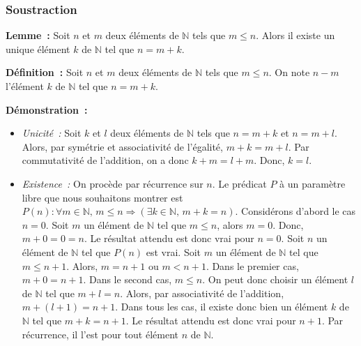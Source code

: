    \done 

\subsubsection{Soustraction}

\noindent\textbf{Lemme :} Soit $n$ et $m$ deux éléments de $\mathbb{N}$ tels que $m \leq n$. 
    Alors il existe un unique élément $k$ de $\mathbb{N}$ tel que $n=m+k$.

\medskip

\noindent\textbf{Définition :} Soit $n$ et $m$ deux éléments de $\mathbb{N}$ tels que $m \leq n$. 
    On note $n-m$ l'élément $k$ de $\mathbb{N}$ tel que $n = m  + k$.

\medskip

\noindent\textbf{Démonstration :} 
    \begin{itemize}[nosep]
        \item \textit{Unicité :}
            Soit $k$ et $l$ deux éléments de $\mathbb{N}$ tels que $n = m + k$ et $n = m + l$.
            Alors, par symétrie et associativité de l'égalité, $m + k = m + l$. 
            Par commutativité de l'addition, on a donc $k + m = l + m$.
            Donc, $k = l$.
        \item \textit{Existence :}
            On procède par récurrence sur $n$. 
            Le prédicat $P$ à un paramètre libre que nous souhaitons montrer est $P(n): \forall m \in \mathbb{N}, \, m \leq n \Rightarrow (\exists k \in \mathbb{N}, \, m+k=n)$.
            Considérons d'abord le cas $n=0$. 
            Soit $m$ un élément de $\mathbb{N}$ tel que $m \leq n$, alors $m=0$. 
            Donc, $m+0 = 0 = n$. 
            Le résultat attendu est donc vrai pour $n=0$.
            Soit $n$ un élément de $\mathbb{N}$ tel que $P(n)$ est vrai. 
            Soit $m$ un élément de $\mathbb{N}$ tel que $m \leq n+1$. 
            Alors, $m = n+1$ ou $m < n+1$. 
            Dans le premier cas, $m+0=n+1$. 
            Dans le second cas, $m \leq n$. 
            On peut donc choisir un élément $l$ de $\mathbb{N}$ tel que $m+l=n$. 
            Alors, par associativité de l'addition, $m+(l+1)=n+1$. 
            Dans tous les cas, il existe donc bien un élément $k$ de $\mathbb{N}$ tel que $m+k=n+1$.
            Le résultat attendu est donc vrai pour $n+1$. 
            Par récurrence, il l'est pour tout élément $n$ de $\mathbb{N}$.
    \end{itemize}

   \done 

\medskip


